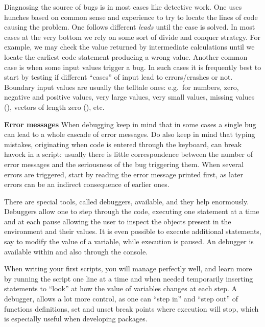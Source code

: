 \documentclass[krantz2]{krantz}\usepackage{knitr}%
\begin{document}
Diagnosing the source of bugs is in most cases like detective work. One uses hunches based on common sense and experience to try to locate the lines of code causing the problem. One follows different \emph{leads} until the case is solved. In most cases at the very bottom we rely on some sort of divide and conquer strategy. For example, we may check the value returned by intermediate calculations until we locate the earliest code statement producing a wrong value. Another common case is when some input values trigger a bug. In such cases it is frequently best to start by testing if different ``cases'' of input lead to errors/crashes or not. Boundary input values are usually the telltale ones: e.g.\ for numbers, zero, negative and positive values, very large values, very small values, missing values (), vectors of length zero (), etc.

\begin{warningbox}
  \textbf{Error messages} When debugging keep in mind that in some cases a single bug can lead to a whole cascade of error messages. Do also keep in mind that typing mistakes, originating when code is entered through the keyboard, can break havock in a script: usually there is little correspondence between the number of error messages and the seriousness of the bug triggering them. When several errors are triggered, start by reading the error message printed first, as later errors can be an indirect consequence of earlier ones.
\end{warningbox}

There are special tools, called debuggers, available, and they help enormously. Debuggers allow one to step through the code, executing one statement at a time and at each pause allowing the user to inspect the objects present in the \Rlang environment and their values. It is even possible to execute additional statements, say to modify the value of a variable, while execution is paused. An \Rlang debugger is available within \RStudio and also through the \Rlang console.

When writing your first scripts, you will manage perfectly well, and learn more by running the script one line at a time and when needed temporarily inserting  statements to ``look'' at how the value of variables changes at each step. A debugger, allows a lot more control, as one can ``step in'' and ``step out'' of functions definitions, set and unset break points where execution will stop, which is especially useful when developing \Rlang packages.
\end{document}
